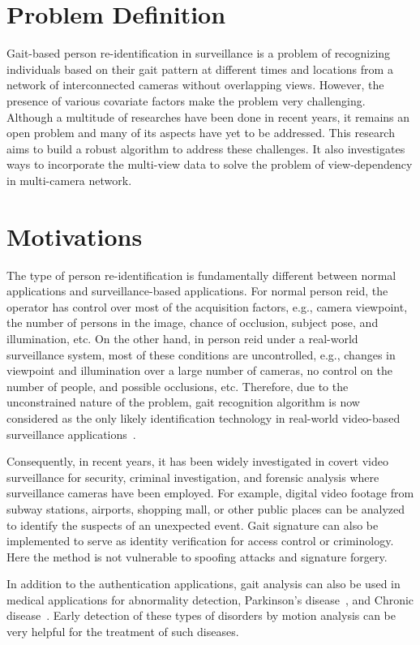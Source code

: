\section{Problem Definition}
Gait-based person re-identification in surveillance is a problem of recognizing individuals based on their gait pattern at different times and locations from a network of interconnected cameras without overlapping views. However, the presence of various covariate factors make the problem very challenging. Although a multitude of researches have been done in recent years, it remains an open problem and many of its aspects have yet to be addressed. This research aims to  build a robust algorithm to address these challenges. It also investigates ways to incorporate the multi-view data to solve the problem of view-dependency in multi-camera network.


\section{Motivations}
The type of person re-identification is fundamentally different between normal applications and surveillance-based applications. For normal person \gls{reid}, the operator has control over most of the acquisition factors, e.g., camera viewpoint, the number of persons in the image, chance of occlusion, subject pose, and illumination, etc. On the other hand, in person \gls{reid} under a real-world surveillance system, most of these conditions are uncontrolled, e.g., changes in viewpoint and illumination over a large number of cameras, no control on the number of people, and possible occlusions, etc. Therefore, due to the unconstrained nature of the problem, gait recognition algorithm is now considered as the only likely identification technology in real-world video-based surveillance applications~\cite{Lee_14}.

Consequently, in recent years, it has been widely investigated in covert video surveillance for security, criminal investigation, and forensic analysis where surveillance cameras have been employed. For example, digital video footage from subway stations, airports, shopping mall, or other public places can be analyzed to identify the suspects of an unexpected event. Gait signature can also be implemented to serve as identity verification for access control or criminology. Here the method is not vulnerable to spoofing attacks and signature forgery. 

In addition to the authentication applications, gait analysis can also be used in medical applications for abnormality detection, Parkinson's disease~\cite{Michele_17}, and Chronic disease~\cite{Juen_14}. Early detection of these types of disorders by motion analysis can be very helpful for the treatment of such diseases.




